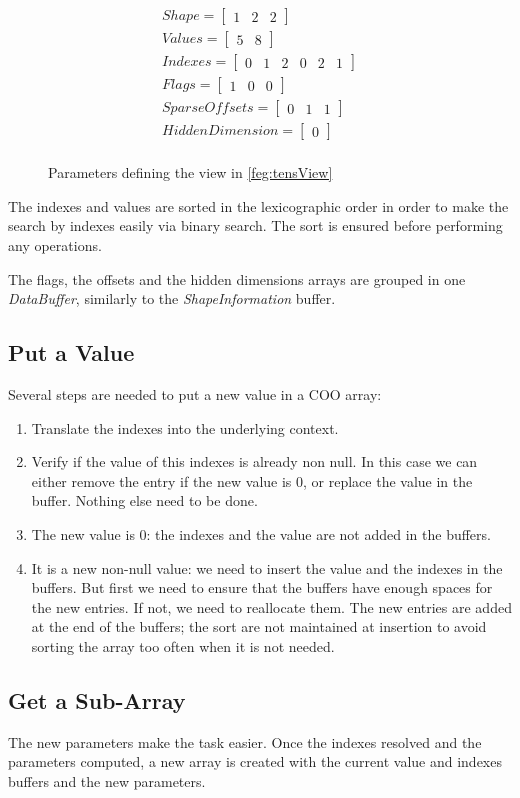 	\begin{figure}[h]
	
			\[
			\begin{aligned}
			Shape = 
			\begin{bmatrix}
			1 & 2 & 2 
			\end{bmatrix}\\
			Values = 
			\begin{bmatrix}
			5 & 8 
			\end{bmatrix}\\			
			Indexes = 
			\begin{bmatrix}
			0 &  1 & 2 & 0 & 2 & 1
			\end{bmatrix}\\			
			Flags = 
			\begin{bmatrix}
			1 & 0 & 0
			\end{bmatrix}\\			
			SparseOffsets = 
			\begin{bmatrix}
			0 &  1 & 1
			\end{bmatrix}\\			
			HiddenDimension = 
			\begin{bmatrix}
			0 
			\end{bmatrix}\\			
			\end{aligned}
			\]
			\caption{Parameters defining the view in \ref{feg:tensView}}
			\label{eqn:viewParams}
	\end{figure}
	The indexes and values are sorted in the lexicographic order in order to make the search by indexes easily via binary search. The sort is ensured before performing any operations.
	
	The flags, the offsets and the hidden dimensions arrays are grouped in one \textit{DataBuffer}, similarly to the \textit{ShapeInformation} buffer.
\subsection{Put a Value}

Several steps are needed to put a new value in a COO array:
\begin{enumerate}
	\item Translate the indexes into the underlying context.
	\item Verify if the value of this indexes is already non null. In this case we can either remove the entry if the new value is 0, or replace the value in the buffer. Nothing else need to be done.
	\item The new value is 0: the indexes and the value are not added in the buffers.
	\item It is a new non-null value: we need to insert the value and the indexes in the buffers. But first we need to ensure that the buffers have enough spaces for the new entries. If not, we need to reallocate them. The new entries are added at the end of the buffers; the sort are not maintained at insertion to avoid sorting the array too often when it is not needed.
\end{enumerate}

\subsection{Get a Sub-Array}

The new parameters make the task easier. Once the indexes resolved and the parameters computed, a new array is created with the current value and indexes buffers and the new parameters. 
